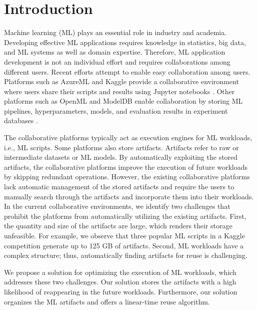 \section{Introduction} \label{sec-introduction}
Machine learning (ML) plays an essential role in industry and academia. 
Developing effective ML applications requires knowledge in statistics, big data, and ML systems as well as domain expertise.
Therefore, ML application development is not an individual effort and requires collaborations among different users.
Recent efforts attempt to enable easy collaboration among users.
Platforms such as AzureML \cite{team2016azureml} and Kaggle \cite{kagglewebsite} provide a collaborative environment where users share their scripts and results using Jupyter notebooks \cite{Kluyver:2016aa}.
Other platforms such as OpenML \cite{vanschoren2014openml} and ModelDB \cite{vartak2016m} enable collaboration by storing ML pipelines, hyperparameters, models, and evaluation results in experiment databases \cite{Vanschoren2012}.

The collaborative platforms typically act as execution engines for ML workloads, i.e., ML scripts.
Some platforms also store artifacts.
Artifacts refer to raw or intermediate datasets or ML models.
By automatically exploiting the stored artifacts, the collaborative platforms improve the execution of future workloads by skipping redundant operations.
However, the existing collaborative platforms lack automatic management of the stored artifacts and require the users to manually search through the artifacts and incorporate them into their workloads.
In the current collaborative environments, we identify two challenges that prohibit the platforms from automatically utilizing the existing artifacts.
First, the quantity and size of the artifacts are large, which renders their storage unfeasible.
For example, we observe that three popular ML scripts in a Kaggle competition generate up to 125 GB of artifacts.
Second, ML workloads have a complex structure; thus, automatically finding artifacts for reuse is challenging.

We propose a solution for optimizing the execution of ML workloads, which addresses these two challenges.
Our solution stores the artifacts with a high likelihood of reappearing in the future workloads.
Furthermore, our solution organizes the ML artifacts and offers a linear-time reuse algorithm.

